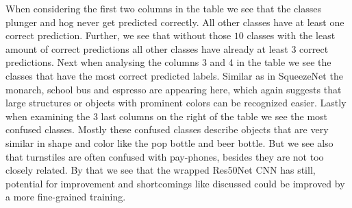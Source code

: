 \documentclass[11pt]{article}
\begin{document}
When considering the first two columns in the table we see that the classes plunger and hog never get predicted correctly. All other classes have at least one correct prediction. Further, we see that without those $10$ classes with the least amount of correct predictions all other classes have already at least 3 correct predictions. Next when analysing the columns 3 and 4 in the table we see the classes that have the most correct predicted labels. Similar as in SqueezeNet the monarch, school bus and espresso are appearing here, which again suggests that large structures or objects with prominent colors can be recognized easier. Lastly when examining the 3 last columns on the right of the table we see the most confused classes. Mostly these confused classes describe objects that are very similar in shape and color like the pop bottle and beer bottle. But we see also that turnstiles are often confused with pay-phones, besides they are not too closely related. By that we see that the wrapped Res50Net CNN has still, potential for improvement and shortcomings like discussed could be improved by a more fine-grained training.


\newpage


\end{document}
